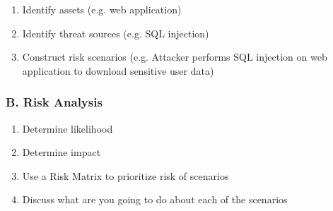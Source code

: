 \begin{enumerate}
    \item Identify assets (e.g. web application)
    \item Identify threat sources (e.g. SQL injection)
    \item Construct risk scenarios (e.g. Attacker performs SQL injection on web application to download sensitive user data)
\end{enumerate}

\subsubsection{B. Risk Analysis}

\begin{enumerate}
    \item Determine likelihood
    \item Determine impact
    \item Use a Risk Matrix to prioritize risk of scenarios
    \item Discuss what are you going to do about each of the scenarios
\end{enumerate}
